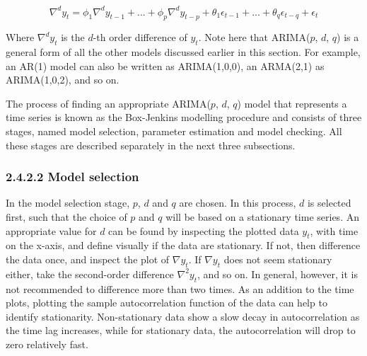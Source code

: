 \documentclass[12pt,oneside]{reedthesis}
\begin{document}
\[ 
\nabla^{d}y_{t} = \phi_{1}\nabla^{d}y_{t-1} + ... + \phi_{p}\nabla^{d}y_{t-p} + \theta_{1}\epsilon_{t-1} + ... + \theta_{q}\epsilon_{t-q} + \epsilon_{t} 
\]

Where \(\nabla^{d}y_{t}\) is the \(d\)-th order difference of \(y_{t}\).
Note here that ARIMA(\(p\), \(d\), \(q\)) is a general form of all the
other models discussed earlier in this section. For example, an AR(1)
model can also be written as ARIMA(1,0,0), an ARMA(2,1) as ARIMA(1,0,2),
and so on.

The process of finding an appropriate ARIMA(\(p\), \(d\), \(q\)) model
that represents a time series is known as the Box-Jenkins modelling
procedure and consists of three stages, named model selection, parameter
estimation and model checking. All these stages are described separately
in the next three subsections.

\subsubsection{2.4.2.2 Model selection}\label{model-selection}

In the model selection stage, \(p\), \(d\) and \(q\) are chosen. In this
process, \(d\) is selected first, such that the choice of \(p\) and
\(q\) will be based on a stationary time series. An appropriate value
for \(d\) can be found by inspecting the plotted data \(y_{t}\), with
time on the x-axis, and define visually if the data are stationary. If
not, then difference the data once, and inspect the plot of
\(\nabla y_{t}\). If \(\nabla y_{t}\) does not seem stationary either,
take the second-order difference \(\nabla^{2} y_{t}\), and so on. In
general, however, it is not recommended to difference more than two
times. As an addition to the time plots, plotting the sample
autocorrelation function of the data can help to identify stationarity.
Non-stationary data show a slow decay in autocorrelation as the time lag
increases, while for stationary data, the autocorrelation will drop to
zero relatively fast.
\end{document}
